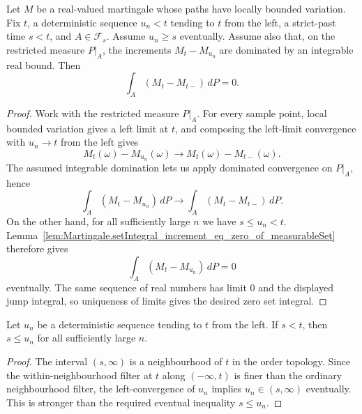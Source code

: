 \begin{lemma}\label{lem:Martingale.setIntegral_jump_leftLim_eq_zero_of_left_approach_of_dominated}
Let \(M\) be a real-valued martingale whose paths have locally bounded
variation.  Fix \(t\), a deterministic sequence \(u_n<t\) tending to \(t\)
from the left, a strict-past time \(s<t\), and \(A\in\mathcal F_s\).
Assume \(u_n\ge s\) eventually.  Assume also that, on the restricted measure
\(P|_A\), the increments \(M_t-M_{u_n}\) are dominated by an integrable real
bound.  Then
\[
  \int_A (M_t-M_{t-})\,dP=0 .
\]
\end{lemma}

\begin{proof}
Work with the restricted measure \(P|_A\).  For every sample point, local
bounded variation gives a left limit at \(t\), and composing the left-limit
convergence with \(u_n\to t\) from the left gives
\[
  M_t(\omega)-M_{u_n}(\omega)\longrightarrow M_t(\omega)-M_{t-}(\omega).
\]
The assumed integrable domination lets us apply dominated convergence on
\(P|_A\), hence
\[
  \int_A (M_t-M_{u_n})\,dP
    \longrightarrow
  \int_A (M_t-M_{t-})\,dP .
\]
On the other hand, for all sufficiently large \(n\) we have \(s\le u_n<t\).
Lemma~\ref{lem:Martingale.setIntegral_increment_eq_zero_of_measurableSet}
therefore gives
\[
  \int_A (M_t-M_{u_n})\,dP=0
\]
eventually.  The same sequence of real numbers has limit \(0\) and the
displayed jump integral, so uniqueness of limits gives the desired zero
set integral.
\end{proof}

\begin{lemma}\label{lem:Tendsto.eventually_const_le_of_nhdsWithin_Iio}
Let \(u_n\) be a deterministic sequence tending to \(t\) from the left.
If \(s<t\), then \(s\le u_n\) for all sufficiently large \(n\).
\end{lemma}

\begin{proof}
The interval \((s,\infty)\) is a neighbourhood of \(t\) in the order
topology.  Since the within-neighbourhood filter at \(t\) along
\((-\infty,t)\) is finer than the ordinary neighbourhood filter, the
left-convergence of \(u_n\) implies \(u_n\in(s,\infty)\) eventually.  This
is stronger than the required eventual inequality \(s\le u_n\).
\end{proof}

